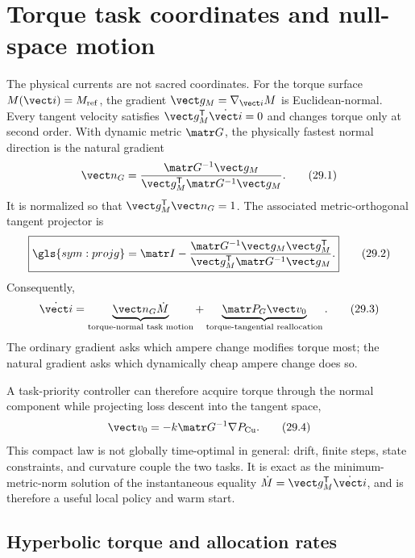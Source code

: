 \section{Torque task coordinates and null-space motion}
\label{sec:task-coordinates}

The physical currents are not sacred coordinates.  For the torque surface
\(M(\vect i)=M_{\mathrm{ref}}\), the gradient
\(\vect g_M=\nabla_{\vect i}M\) is Euclidean-normal.  Every tangent velocity
satisfies \(\vect g_M^{\mathsf T}\dot{\vect i}=0\) and changes torque only at
second order.  With dynamic metric \(\matr G\), the physically fastest normal
direction is the natural gradient
\[
 \vect n_G=\frac{\matr G^{-1}\vect g_M}
 {\vect g_M^{\mathsf T}\matr G^{-1}\vect g_M}.
 \tag{29.1}
\]
It is normalized so that \(\vect g_M^{\mathsf T}\vect n_G=1\).  The associated
metric-orthogonal tangent projector is
\[
 \boxed{\gls{sym:projg}=\matr I-
 \frac{\matr G^{-1}\vect g_M\vect g_M^{\mathsf T}}
 {\vect g_M^{\mathsf T}\matr G^{-1}\vect g_M}.}
 \tag{29.2}
\]
Consequently,
\[
 \dot{\vect i}=\underbrace{\vect n_G\dot M}_{\text{torque-normal task motion}}
 +\underbrace{\matr P_G\vect v_0}_{\text{torque-tangential reallocation}}.
 \tag{29.3}
\]
The ordinary gradient asks which ampere change modifies torque most; the
natural gradient asks which dynamically cheap ampere change does so.



A task-priority controller can therefore acquire torque through the normal
component while projecting loss descent into the tangent space,
\[
 \vect v_0=-k\matr G^{-1}\nabla P_{\mathrm{Cu}}.
 \tag{29.4}
\]
This compact law is not globally time-optimal in general: drift, finite steps,
state constraints, and curvature couple the two tasks.  It is exact as the
minimum-metric-norm solution of the instantaneous equality
\(\dot M=\vect g_M^{\mathsf T}\dot{\vect i}\), and is therefore a useful local
policy and warm start.

\subsection{Hyperbolic torque and allocation rates}

